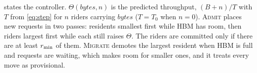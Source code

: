  states the controller. $\Theta(\mathit{bytes}, n)$ is the
predicted throughput, $(B + n)/T$ with $T$ from \cref{eq:step} for $n$ riders
carrying $\mathit{bytes}$ ($T = T_0$ when $n = 0$). \textsc{Admit} places new
requests in two passes: residents smallest first while HBM has room, then
riders largest first while each still raises $\Theta$. The riders are committed only if there are at least $r_{\min}$ of
them.
\textsc{Migrate} demotes the largest resident when HBM is full and requests are
waiting, which makes room for smaller ones, and it treats every move as
provisional.

